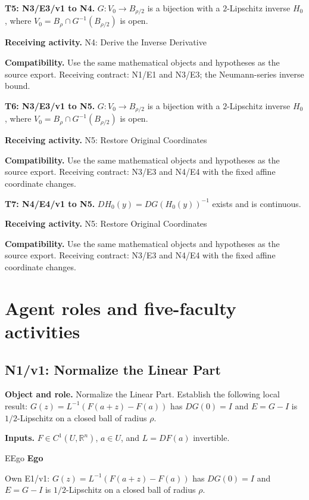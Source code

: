 \documentclass[preprint,12pt,aps,pra,showkeys,amsmath,amssymb,superscriptaddress,floatfix]{revtex4-2}
\theoremstyle{definition}
\theoremstyle{remark}
\newcommand{\mmfaculty}[3]{%
 \begin{mmfacultybox}{#1}{#2}
 {\sffamily\bfseries\color{MMBlue}#2}\par\smallskip #3
 \end{mmfacultybox}}
\newcommand{\field}[2]{\par\smallskip\noindent\textbf{#1.} #2\par}
\begin{document}
\field{T5: N3/E3/v1 to N4}{\(G:V_0\to B_{\rho/2}\) is a bijection with a \(2\)-Lipschitz inverse
\(H_0\), where \(V_0=B_\rho\cap G^{-1}(B_{\rho/2})\) is open.}

\field{Receiving activity}{N4: Derive the Inverse Derivative}

\field{Compatibility}{Use the same mathematical objects and hypotheses as the source export.
Receiving contract: N1/E1 and N3/E3; the Neumann-series inverse bound.}

\field{T6: N3/E3/v1 to N5}{\(G:V_0\to B_{\rho/2}\) is a bijection with a \(2\)-Lipschitz inverse
\(H_0\), where \(V_0=B_\rho\cap G^{-1}(B_{\rho/2})\) is open.}

\field{Receiving activity}{N5: Restore Original Coordinates}

\field{Compatibility}{Use the same mathematical objects and hypotheses as the source export.
Receiving contract: N3/E3 and N4/E4 with the fixed affine coordinate
changes.}

\field{T7: N4/E4/v1 to N5}{\(DH_0(y)=DG(H_0(y))^{-1}\) exists and is continuous.}

\field{Receiving activity}{N5: Restore Original Coordinates}

\field{Compatibility}{Use the same mathematical objects and hypotheses as the source export.
Receiving contract: N3/E3 and N4/E4 with the fixed affine coordinate
changes.}

\endgroup

\clearpage\section{Agent roles and five-faculty activities}\begingroup\small\linespread{1.05}\selectfont{}

\subsection{N1/v1: Normalize the Linear Part}

\field{Object and role}{Normalize the Linear Part. Establish the following local result:
\(G(z)=L^{-1}(F(a+z)-F(a))\) has \(DG(0)=I\) and \(E=G-I\) is
\(1/2\)-Lipschitz on a closed ball of radius \(\rho\).}

\field{Inputs}{\(F\in C^1(U,\mathbb R^n)\), \(a\in U\), and \(L=DF(a)\) invertible.}

\mmfaculty{E}{Ego}{Own E1/v1: \(G(z)=L^{-1}(F(a+z)-F(a))\) has \(DG(0)=I\) and \(E=G-I\) is
\(1/2\)-Lipschitz on a closed ball of radius \(\rho\).}
\end{document}
